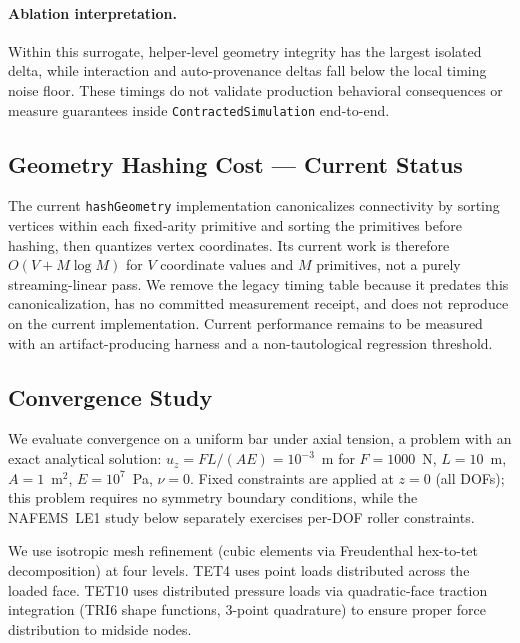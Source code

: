 \documentclass[journal]{IEEEtran}
\begin{document}
\paragraph{Ablation interpretation.}
Within this surrogate, helper-level geometry integrity has the largest isolated
delta, while interaction and auto-provenance deltas fall below the local timing
noise floor. These timings do not validate production behavioral consequences
or measure guarantees inside \texttt{ContractedSimulation} end-to-end.

\subsection{Geometry Hashing Cost --- Current Status}

The current \texttt{hashGeometry} implementation canonicalizes connectivity by
sorting vertices within each fixed-arity primitive and sorting the primitives
before hashing, then quantizes vertex coordinates. Its current work is therefore
$O(V + M\log M)$ for $V$ coordinate values and $M$ primitives, not a purely
streaming-linear pass. We remove the legacy timing table because it predates
this canonicalization, has no committed measurement receipt, and does not
reproduce on the current implementation. Current performance remains to be
measured with an artifact-producing harness and a non-tautological regression
threshold.

\subsection{Convergence Study}
\label{sec:evaluation:convergence}

We evaluate convergence on a uniform bar under axial tension, a problem
with an exact analytical solution: $u_z = FL/(AE) = 10^{-3}$~m for
$F = 1000$~N, $L = 10$~m, $A = 1$~m$^2$, $E = 10^7$~Pa, $\nu = 0$.
Fixed constraints are applied at $z = 0$ (all DOFs); this problem requires
no symmetry boundary conditions, while the NAFEMS~LE1 study below separately
exercises per-DOF roller constraints.

We use isotropic mesh refinement (cubic elements via Freudenthal hex-to-tet
decomposition) at four levels. TET4 uses point loads distributed across the
loaded face. TET10 uses distributed pressure loads via quadratic-face
traction integration (TRI6 shape functions, 3-point quadrature) to ensure
proper force distribution to midside nodes.
\end{document}
